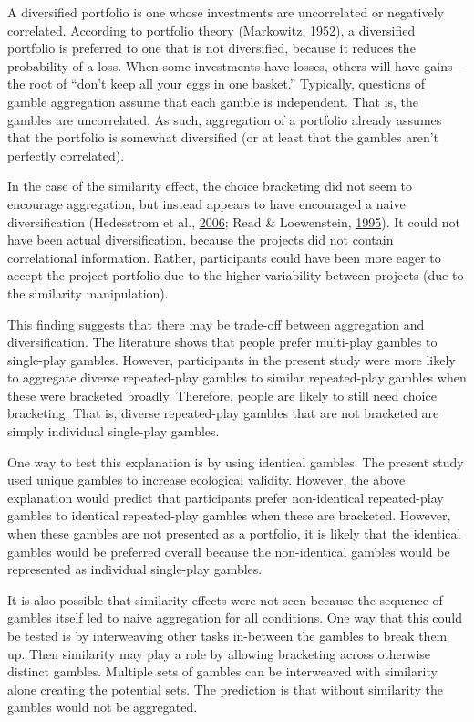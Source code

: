 \documentclass[
  english,
  man, donotrepeattitle,floatsintext]{apa7}
\theoremstyle{definition}
\theoremstyle{definition}
\theoremstyle{definition}
\theoremstyle{definition}
\theoremstyle{remark}
\begin{document}
A diversified portfolio is one whose investments are uncorrelated or negatively
correlated. According to portfolio theory (Markowitz, \protect\hyperlink{ref-markowitz1952}{1952}), a diversified
portfolio is preferred to one that is not diversified, because it reduces the
probability of a loss. When some investments have losses, others will have
gains---the root of ``don't keep all your eggs in one basket.'' Typically,
questions of gamble aggregation assume that each gamble is independent. That is,
the gambles are uncorrelated. As such, aggregation of a portfolio already
assumes that the portfolio is somewhat diversified (or at least that the gambles
aren't perfectly correlated).

In the case of the similarity effect, the choice bracketing did not seem to
encourage aggregation, but instead appears to have encouraged a naive
diversification (Hedesstrom et al., \protect\hyperlink{ref-hedesstrom2006}{2006}; Read \& Loewenstein, \protect\hyperlink{ref-read1995}{1995}). It could not have been actual
diversification, because the projects did not contain correlational information.
Rather, participants could have been more eager to accept the project portfolio
due to the higher variability between projects (due to the similarity
manipulation).

This finding suggests that there may be trade-off between aggregation and
diversification. The literature shows that people prefer multi-play gambles to
single-play gambles. However, participants in the present study were more likely to
aggregate diverse repeated-play gambles to similar repeated-play gambles when
these were bracketed broadly. Therefore, people are likely to still need choice
bracketing. That is, diverse repeated-play gambles that are not bracketed are
simply individual single-play gambles.

One way to test this explanation is by using identical gambles. The present study
used unique gambles to increase ecological validity. However, the above
explanation would predict that participants prefer non-identical repeated-play
gambles to identical repeated-play gambles when these are bracketed. However,
when these gambles are not presented as a portfolio, it is likely that the
identical gambles would be preferred overall because the non-identical gambles
would be represented as individual single-play gambles.

It is also possible that similarity effects were not seen because the sequence
of gambles itself led to naive aggregation for all conditions. One way that this
could be tested is by interweaving other tasks in-between the gambles to break
them up. Then similarity may play a role by allowing bracketing across otherwise
distinct gambles. Multiple sets of gambles can be interweaved with similarity
alone creating the potential sets. The prediction is that without similarity the
gambles would not be aggregated.
\end{document}
